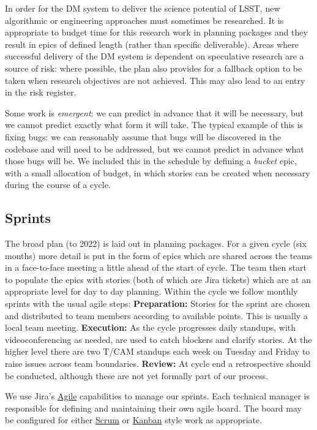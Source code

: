 \noindent In order for the DM system to deliver the science potential of LSST, new algorithmic or engineering approaches must sometimes be researched.
It is appropriate to budget time for this research work in planning packages and they result in epics of defined length (rather than specific  deliverable).
Areas where successful delivery of the DM system is dependent on speculative research are a source of risk: where possible, the plan  also provides for a fallback option to be taken when research objectives are not achieved.
This may also lead to an entry in the risk register.\cite{2016SPIE.9911E..0NK}


\noindent Some work is \emph{emergent}: we can predict in advance that it will be necessary, but we cannot
predict exactly what form it will take. The typical example of this is fixing bugs: we can reasonably
assume that bugs will be discovered in the codebase and will need to be addressed,
but we cannot predict in advance what those bugs will be.
We included this in the schedule by defining a \emph{bucket} epic, with a small allocation of budget, in which stories can be created
when necessary during the course of a cycle.

\subsection{Sprints} \label{sec:sprint} \label{sec:jira_ticket}
The broad plan (to 2022) is laid out in planning packages.
For a  given  cycle (six months)   more detail is put in the form of epics which  are shared across the teams in a face-to-face meeting a little ahead of the start of cycle.  The team then start to populate the epics with stories (both of which are Jira tickets)  which are at an appropriate level for day to day planning.
Within the cycle we follow monthly sprints with the usual agile steps:
\textbf{Preparation:} Stories for the sprint are chosen and distributed to team members according to available points. This is usually a local team meeting. \textbf{Execution:} As the cycle progresses daily standups, with videoconferencing as needed,  are used to catch blockers and clarify stories. At the higher level there are two T/CAM standups each week on Tuesday and Friday to raise issues across team boundaries. \textbf{Review:} At cycle end a retrospective should be conducted, although these are not yet formally part of our process.

\noindent We use Jira's
\href{https://www.atlassian.com/software/jira/agile}{Agile} capabilities
to manage our sprints. Each technical manager is responsible for
defining and maintaining their own agile board. The board may be
configured for either
\href{https://en.wikipedia.org/wiki/Scrum_(software_development)}{Scrum}
or \href{https://en.wikipedia.org/wiki/Kanban_(development)}{Kanban}
style work as appropriate.

